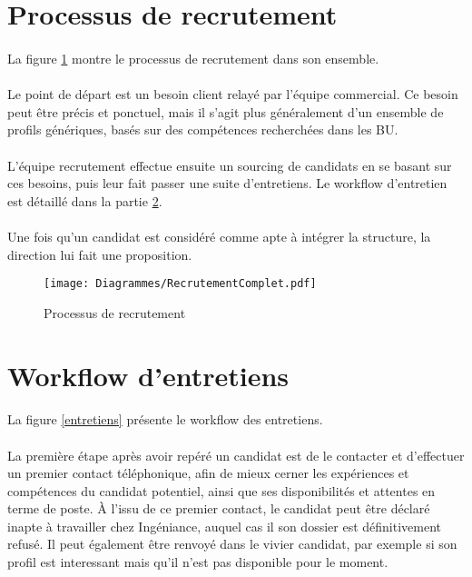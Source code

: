 \section{Processus de recrutement}

\paragraph{} La figure \ref{recrutementFull} montre le processus de recrutement dans son ensemble.
\paragraph{} Le point de départ est un besoin client relayé par l'équipe commercial. Ce besoin peut être précis et ponctuel, mais il s'agit plus généralement d'un ensemble de profils génériques, basés sur des compétences recherchées dans les BU.
\paragraph{} L'équipe recrutement effectue ensuite un sourcing de candidats en se basant sur ces besoins, puis leur fait passer une suite d'entretiens. Le workflow d'entretien est détaillé dans la partie \ref{sec:entretiens}.
\paragraph{} Une fois qu'un candidat est considéré comme apte à intégrer la structure, la direction lui fait une proposition.

\begin{figure}
	\centering
	\begin{sideways}
	\texttt{[image: Diagrammes/RecrutementComplet.pdf]}
	\end{sideways}
	\caption{Processus de recrutement}
	\label{recrutementFull}	
\end{figure}

\section{Workflow d'entretiens}
\label{sec:entretiens}

\paragraph{} La figure \ref{entretiens} présente le workflow des entretiens.
\paragraph{} La première étape après avoir repéré un candidat est de le contacter et d'effectuer un premier contact téléphonique, afin de mieux cerner les expériences et compétences du candidat potentiel, ainsi que ses disponibilités et attentes en terme de poste. À l'issu de ce premier contact, le candidat peut être déclaré inapte à travailler chez Ingéniance, auquel cas il son dossier est définitivement refusé. Il peut également être renvoyé dans le vivier candidat, par exemple si son profil est interessant mais qu'il n'est pas disponible pour le moment. 
